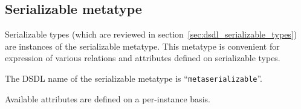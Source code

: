\subsection{Serializable metatype}\label{sec:dsdl_metaserializable}

Serializable types (which are reviewed in section~\ref{sec:dsdl_serializable_types})
are instances of the serializable metatype.
This metatype is convenient for expression of various relations and attributes defined on serializable types.

The DSDL name of the serializable metatype is ``\verb|metaserializable|''.

Available attributes are defined on a per-instance basis.
